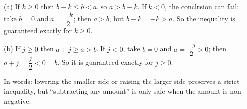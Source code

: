 (a) If $k\ge0$ then $b-k\le b<a$, so $a>b-k$. If $k<0$, the conclusion can fail: take $b=0$ and $a=\dfrac{-k}{2}$; then $a>b$, but $b-k=-k>a$. So the inequality is guaranteed exactly for $\boxed{k\ge0}$.

(b) If $j\ge0$ then $a+j\ge a>b$. If $j<0$, take $b=0$ and $a=\dfrac{-j}{2}>0$; then $a+j=\dfrac{j}{2}<0=b$. So it is guaranteed exactly for $\boxed{j\ge0}$.

In words: lowering the smaller side or raising the larger side preserves a strict inequality, but ``subtracting any amount'' is only safe when the amount is non-negative.
